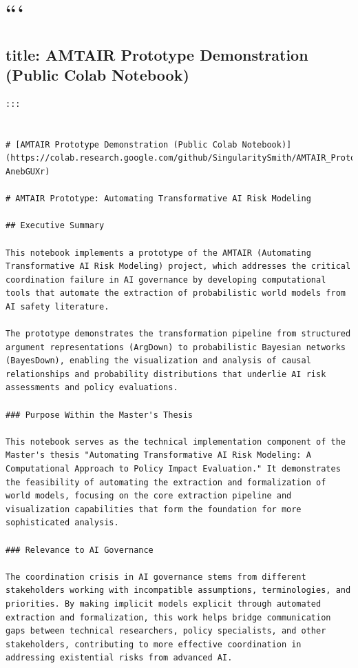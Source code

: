 \documentclass[
  11pt,
  letterpaper,
]{book}
\begin{document}

\chapter{```}\label{section}

\section{title: AMTAIR Prototype Demonstration (Public Colab
Notebook)}\label{title-amtair-prototype-demonstration-public-colab-notebook}

\begin{verbatim}
:::


# [AMTAIR Prototype Demonstration (Public Colab Notebook)](https://colab.research.google.com/github/SingularitySmith/AMTAIR_Prototype/blob/main/version_history/AMTAIR_Prototype_0_1.3.ipynb#scrollTo=lt8-AnebGUXr)

# AMTAIR Prototype: Automating Transformative AI Risk Modeling

## Executive Summary

This notebook implements a prototype of the AMTAIR (Automating Transformative AI Risk Modeling) project, which addresses the critical coordination failure in AI governance by developing computational tools that automate the extraction of probabilistic world models from AI safety literature.

The prototype demonstrates the transformation pipeline from structured argument representations (ArgDown) to probabilistic Bayesian networks (BayesDown), enabling the visualization and analysis of causal relationships and probability distributions that underlie AI risk assessments and policy evaluations.

### Purpose Within the Master's Thesis

This notebook serves as the technical implementation component of the Master's thesis "Automating Transformative AI Risk Modeling: A Computational Approach to Policy Impact Evaluation." It demonstrates the feasibility of automating the extraction and formalization of world models, focusing on the core extraction pipeline and visualization capabilities that form the foundation for more sophisticated analysis.

### Relevance to AI Governance

The coordination crisis in AI governance stems from different stakeholders working with incompatible assumptions, terminologies, and priorities. By making implicit models explicit through automated extraction and formalization, this work helps bridge communication gaps between technical researchers, policy specialists, and other stakeholders, contributing to more effective coordination in addressing existential risks from advanced AI.


\end{verbatim}
\end{document}

